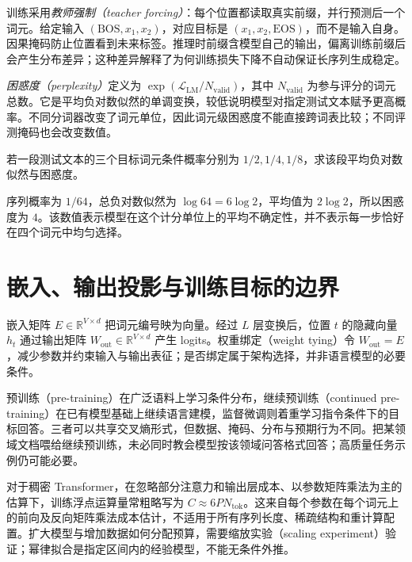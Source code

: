 训练采用\emph{教师强制（teacher forcing）}：每个位置都读取真实前缀，并行预测后一个词元。给定输入 $(\mathrm{BOS},x_1,x_2)$，对应目标是 $(x_1,x_2,\mathrm{EOS})$，而不是输入自身。因果掩码防止位置看到未来标签。推理时前缀含模型自己的输出，偏离训练前缀后会产生分布差异；这种差异解释了为何训练损失下降不自动保证长序列生成稳定。

\emph{困惑度（perplexity）}定义为 $\exp(\mathcal L_{\mathrm{LM}}/N_{\mathrm{valid}})$，其中 $N_{\mathrm{valid}}$ 为参与评分的词元总数。它是平均负对数似然的单调变换，较低说明模型对指定测试文本赋予更高概率。不同分词器改变了词元单位，因此词元级困惑度不能直接跨词表比较；不同评测掩码也会改变数值。

\begin{example}
若一段测试文本的三个目标词元条件概率分别为 $1/2,1/4,1/8$，求该段平均负对数似然与困惑度。
\end{example}
\begin{solve}
序列概率为 $1/64$，总负对数似然为 $\log64=6\log2$，平均值为 $2\log2$，所以困惑度为 $4$。该数值表示模型在这个计分单位上的平均不确定性，并不表示每一步恰好在四个词元中均匀选择。
\end{solve}

\section{嵌入、输出投影与训练目标的边界}

嵌入矩阵 $E\in\mathbb R^{V\times d}$ 把词元编号映为向量。经过 $L$ 层变换后，位置 $t$ 的隐藏向量 $h_t$ 通过输出矩阵 $W_{\mathrm{out}}\in\mathbb R^{V\times d}$ 产生 logits。权重绑定（weight tying）令 $W_{\mathrm{out}}=E$，减少参数并约束输入与输出表征；是否绑定属于架构选择，并非语言模型的必要条件。

预训练（pre-training）在广泛语料上学习条件分布，继续预训练（continued pre-training）在已有模型基础上继续语言建模，监督微调则着重学习指令条件下的目标回答。三者可以共享交叉熵形式，但数据、掩码、分布与预期行为不同。把某领域文档喂给继续预训练，未必同时教会模型按该领域问答格式回答；高质量任务示例仍可能必要。

对于稠密 Transformer，在忽略部分注意力和输出层成本、以参数矩阵乘法为主的估算下，训练浮点运算量常粗略写为 $C\approx6PN_{\mathrm{tok}}$。这来自每个参数在每个词元上的前向及反向矩阵乘法成本估计，不适用于所有序列长度、稀疏结构和重计算配置。扩大模型与增加数据如何分配预算，需要缩放实验（scaling experiment）验证；幂律拟合是指定区间内的经验模型，不能无条件外推。

